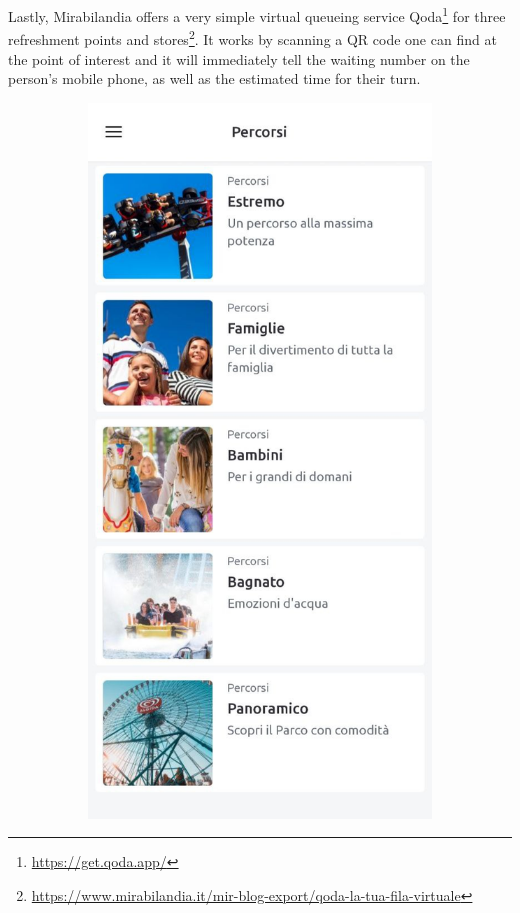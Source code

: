 Lastly, Mirabilandia offers a very simple virtual queueing service Qoda\footnote{\url{https://get.qoda.app/}} for three refreshment points and stores\footnote{\url{https://www.mirabilandia.it/mir-blog-export/qoda-la-tua-fila-virtuale}}.
It works by scanning a QR code one can find at the point of interest and it will immediately tell the waiting number on the person's mobile phone, as well as the estimated time for their turn.

\begin{figure}[H]
	\centering
	\begin{subfigure}[b]{0.35\textwidth}
		\centering
		\includegraphics[width=\textwidth]{img/miraPlan}

\end{subfigure}
\end{figure}

